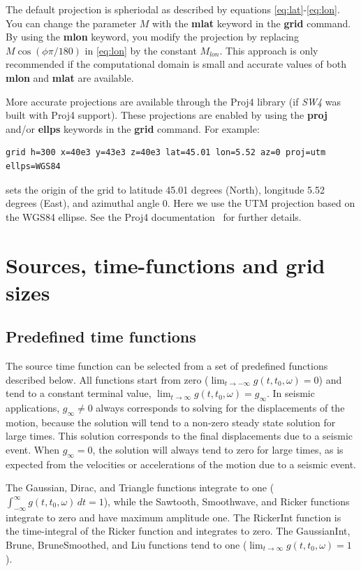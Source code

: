 \documentclass[11pt]{report}
\begin{document}
The default projection is spheriodal as described by equations \eqref{eq:lat}-\eqref{eq:lon}. You
can change the parameter $M$ with the {\bf mlat} keyword in the {\bf grid} command. By using the
{\bf mlon} keyword, you modify the projection by replacing $M\cos(\phi\pi/180)$ in \eqref{eq:lon} by
the constant $M_{lon}$. This approach is only recommended if the computational domain is small and
accurate values of both {\bf mlon} and {\bf mlat} are available.

More accurate projections are available through the Proj4 library (if
\emph{SW4} was built with Proj4 support). These projections are enabled by using the {\bf proj}
and/or {\bf ellps} keywords in the {\bf grid} command. For example:
\begin{verbatim}
grid h=300 x=40e3 y=43e3 z=40e3 lat=45.01 lon=5.52 az=0 proj=utm ellps=WGS84
\end{verbatim}
sets the origin of the grid to latitude 45.01 degrees (North), longitude 5.52 degrees
(East), and azimuthal angle 0. Here we use the UTM projection based on the WGS84 ellipse.
See the Proj4 documentation~\cite{Proj4} for further details.


\chapter{Sources, time-functions and grid sizes}

\section{Predefined time functions}\label{sec:predefined}

The source time function can be selected from a set of predefined functions described below. All
functions start from zero ($\lim_{t\to -\infty} g(t,t_0,\omega) = 0$) and tend to a constant terminal
value, $\lim_{t\to \infty} g(t,t_0,\omega) = g_\infty$. In seismic applications, $g_\infty\ne 0$
always corresponds to solving for the displacements of the motion, because the solution will tend to
a non-zero steady state solution for large times. This solution corresponds to the final
displacements due to a seismic event. When $g_\infty = 0$, the solution will always tend to zero for
large times, as is expected from the velocities or accelerations of the motion due to a seismic event.

The Gaussian, Dirac, and Triangle functions integrate to one ($\int_{-\infty}^{\infty}
g(t,t_0,\omega) \, dt = 1$), while the Sawtooth, Smoothwave, and Ricker functions integrate to zero
and have maximum amplitude one. The RickerInt function is the time-integral of the Ricker function
and integrates to zero. The GaussianInt, Brune, BruneSmoothed, and Liu functions tend to one
($\lim_{t\to\infty} g(t,t_0,\omega) = 1$).
\end{document}
